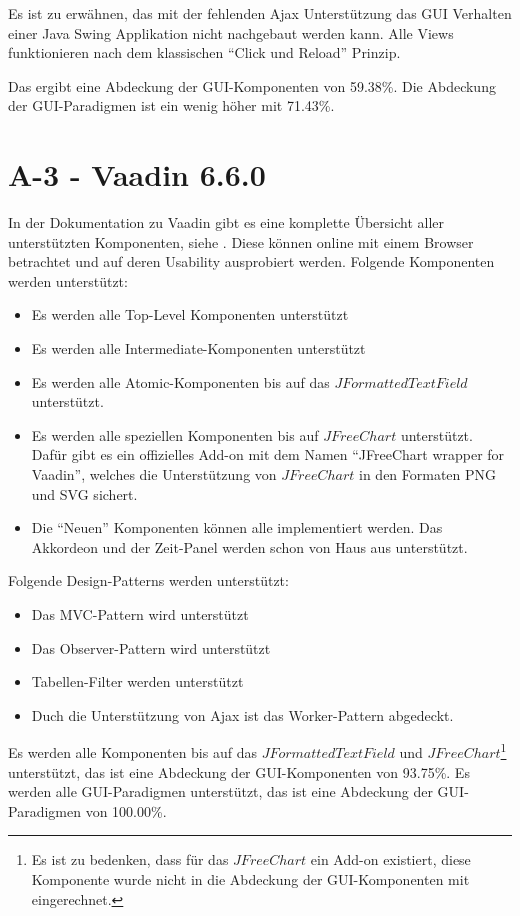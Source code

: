 Es ist zu erwähnen, das mit der fehlenden \ac{Ajax} Unterstützung das
\ac{GUI} Verhalten einer Java Swing Applikation nicht nachgebaut werden kann.
Alle Views funktionieren nach dem klassischen ``Click und Reload'' Prinzip.

Das ergibt eine Abdeckung der GUI-Komponenten von 59.38\%. Die Abdeckung der
GUI-Paradigmen ist ein wenig höher mit 71.43\%.

\section{A-3 - Vaadin 6.6.0}

In der Dokumentation zu Vaadin gibt es eine komplette Übersicht aller
unterstützten Komponenten, siehe \cite{VaadinKomponenten}. Diese können online
mit einem Browser betrachtet und auf deren Usability ausprobiert werden.
Folgende Komponenten werden unterstützt:

\begin{itemize}
  \item Es werden alle Top-Level Komponenten unterstützt
  \item Es werden alle Intermediate-Komponenten unterstützt
  \item Es werden alle Atomic-Komponenten bis auf das
  \(JFormattedTextField\) unterstützt.
  \item Es werden alle speziellen Komponenten bis auf
  \(JFreeChart\) unterstützt. Dafür gibt es ein offizielles
  Add-on mit dem Namen ``JFreeChart wrapper for Vaadin'', welches die
  Unterstützung von \(JFreeChart\) in den Formaten \ac{PNG} und \ac{SVG}
  sichert.
  \item Die ``Neuen'' Komponenten können alle implementiert werden. Das
  Akkordeon und der Zeit-Panel werden schon von Haus aus unterstützt.
\end{itemize}

Folgende Design-Patterns werden unterstützt:

\begin{itemize}
  \item Das MVC-Pattern wird unterstützt
  \item Das Observer-Pattern wird unterstützt
  \item Tabellen-Filter werden unterstützt
  \item Duch die Unterstützung von Ajax ist das Worker-Pattern abgedeckt.
\end{itemize}

Es werden alle Komponenten bis auf das \(JFormattedTextField\) und
\(JFreeChart\)\footnote{Es ist zu bedenken, dass für das \(JFreeChart\) ein
Add-on existiert, diese Komponente wurde nicht in die Abdeckung der
GUI-Komponenten mit eingerechnet.} unterstützt, das ist eine Abdeckung der
GUI-Komponenten von 93.75\%. Es werden alle GUI-Paradigmen unterstützt, das ist
eine Abdeckung der GUI-Paradigmen von 100.00\%.

